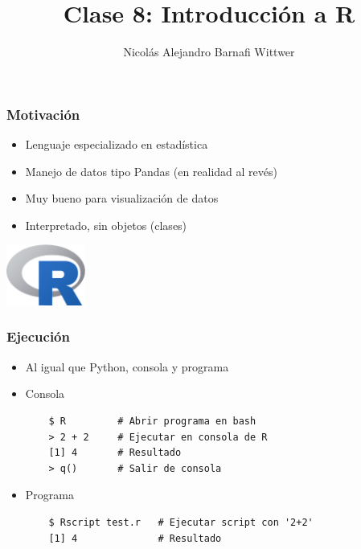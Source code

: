 \documentclass[14pt,aspectratio=169,xcolor=dvipsnames]{beamer}
\title[short title]{Clase 8: Introducción a R}
\subtitle{}
\author[NA Barnafi] {Nicolás Alejandro Barnafi Wittwer}
\institute[UC|CMM] 
{
    Pontificia Universidad Católica de Chile \\
    Centro de Modelamiento Matemático
}
\date{}
\begin{document}
\begin{frame}
    \maketitle
\end{frame}
\begin{frame}\frametitle{Motivación}
    \begin{itemize}
        \item Lenguaje especializado en estadística
        \item Manejo de datos tipo Pandas (en realidad al revés)
        \item Muy bueno para visualización de datos
        \item Interpretado, sin objetos (clases)
    \end{itemize}
    \begin{flushright}
        \includegraphics[height=2cm]{../images/logos/R.png}
    \end{flushright}
\end{frame}
\begin{frame}[fragile]\frametitle{Ejecución}
    \begin{itemize}
        \item Al igual que Python, consola y programa
        \item Consola
            \begin{verbatim}
    $ R         # Abrir programa en bash
    > 2 + 2     # Ejecutar en consola de R
    [1] 4       # Resultado 
    > q()       # Salir de consola
            \end{verbatim}
        \item Programa
            \begin{verbatim}
    $ Rscript test.r   # Ejecutar script con '2+2'
    [1] 4              # Resultado 
            \end{verbatim}

    \end{itemize}
\end{frame}
\end{document}
